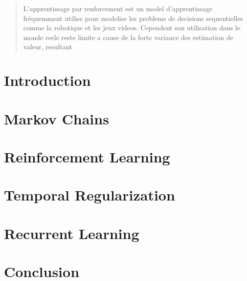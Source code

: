 \documentclass[12pt, oneside, extrafontsizes]{memoir}
\begin{document}
\clearpage
\renewcommand{\abstractname}{Résumé}
\begin{abstract}
L'apprentissage par renforcement est un model d'apprentissage fréquemment utilise  pour modelise les problems de decisions sequentielles comme la robotique et les jeux videos. Cependent son utilisation dans le monde reele reste limite a cause de la forte variance des estimation de valeur, resultant 
\end{abstract}

\clearpage
\setcounter{tocdepth}{2}
\tableofcontents

\clearpage
{}
\chapter{Introduction}


\chapter{Markov Chains}
\label{chap:markov}


\chapter{Reinforcement Learning}
\label{chap:reinforcement}



\chapter{Temporal Regularization}
\label{chap:temporal}



\chapter{Recurrent Learning}
\label{chap:recurrent}




\chapter{Conclusion}


%
%
\printbibliography
\end{document}
